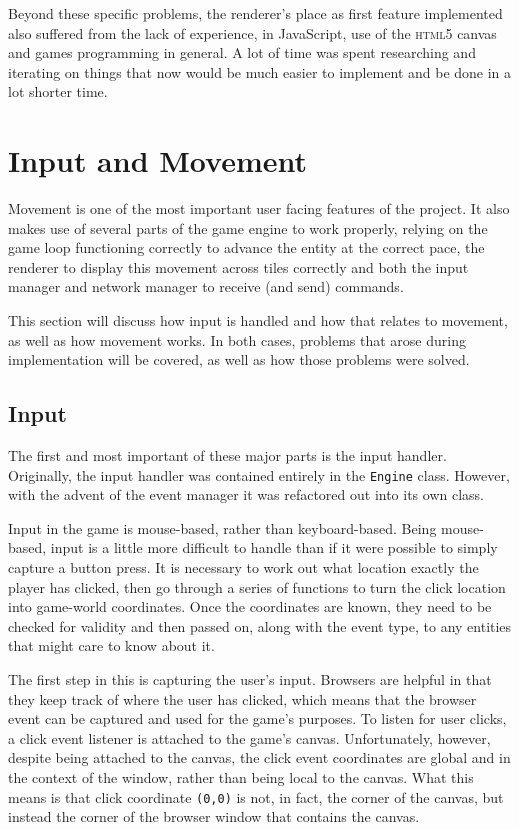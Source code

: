 Beyond these specific problems, the renderer's place as first feature implemented also suffered from the lack of experience, in JavaScript, use of the \textsc{html5} canvas and games programming in general. A lot of time was spent researching and iterating on things that now would be much easier to implement and be done in a lot shorter time.

\section{Input and Movement}
Movement is one of the most important user facing features of the project. It also makes use of several parts of the game engine to work properly, relying on the game loop functioning correctly to advance the entity at the correct pace, the renderer to display this movement across tiles correctly and both the input manager and network manager to receive (and send) commands.

This section will discuss how input is handled and how that relates to movement, as well as how movement works. In both cases, problems that arose during implementation will be covered, as well as how those problems were solved.

\subsection{Input}\label{input_implementation}
The first and most important of these major parts is the input handler. Originally, the input handler was contained entirely in the \texttt{Engine} class. However, with the advent of the event manager it was refactored out into its own class.

Input in the game is mouse-based, rather than keyboard-based. Being mouse-based, input is a little more difficult to handle than if it were possible to simply capture a button press. It is necessary to work out what location exactly the player has clicked, then go through a series of functions to turn the click location into game-world coordinates. Once the coordinates are known, they need to be checked for validity and then passed on, along with the event type, to any entities that might care to know about it.

The first step in this is capturing the user's input. Browsers are helpful in that they keep track of where the user has clicked, which means that the browser event can be captured and used for the game's purposes. To listen for user clicks, a click event listener is attached to the game's canvas. Unfortunately, however, despite being attached to the canvas, the click event coordinates are global and in the context of the window, rather than being local to the canvas. What this means is that click coordinate \texttt{(0,0)} is not, in fact, the corner of the canvas, but instead the corner of the browser window that contains the canvas.

